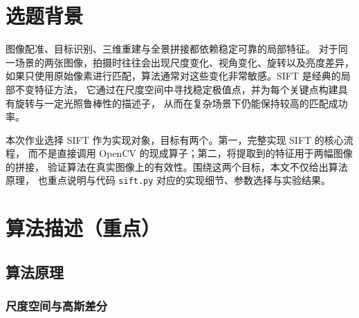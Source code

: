 \documentclass[12pt,hyperref,a4paper,UTF8]{ctexart}
\begin{document}
\cover


\thispagestyle{empty}
\newpage
\tableofcontents
\newpage

\section{选题背景}
图像配准、目标识别、三维重建与全景拼接都依赖稳定可靠的局部特征。
对于同一场景的两张图像，拍摄时往往会出现尺度变化、视角变化、旋转以及亮度差异，
如果只使用原始像素进行匹配，算法通常对这些变化非常敏感。SIFT 是经典的局部不变特征方法，
它通过在尺度空间中寻找稳定极值点，并为每个关键点构建具有旋转与一定光照鲁棒性的描述子，
从而在复杂场景下仍能保持较高的匹配成功率\cite{Lowe2004}。

本次作业选择 SIFT 作为实现对象，目标有两个。第一，完整实现 SIFT 的核心流程，
而不是直接调用 OpenCV 的现成算子；第二，将提取到的特征用于两幅图像的拼接，
验证算法在真实图像上的有效性。围绕这两个目标，本文不仅给出算法原理，
也重点说明与代码 \verb|sift.py| 对应的实现细节、参数选择与实验结果。


\section{算法描述（重点）}
\subsection{算法原理}

\subsubsection{尺度空间与高斯差分}
\end{document}
